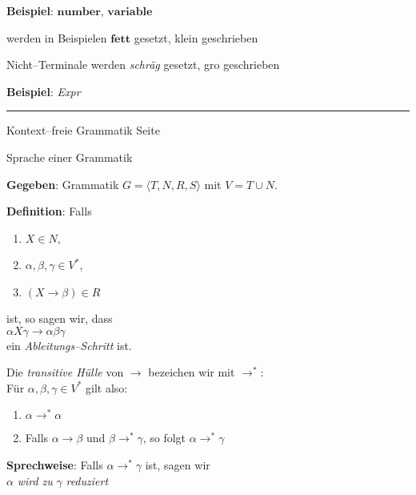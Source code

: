 \begin{slide}{}
\begin{enumerate}
      \textbf{Beispiel}: $\mathbf{number}$, $\mathbf{variable}$
    
      werden in Beispielen $\mathbf{fett}$ gesetzt, klein geschrieben
\end{enumerate}
Nicht--Terminale werden \textsl{schr\"ag} gesetzt, gro\3 geschrieben

\textbf{Beispiel}: \textsl{Expr}

\vspace*{\fill}
\tiny \addtocounter{mypage}{1}
\rule{17cm}{1mm}
Kontext--freie Grammatik  \hspace*{\fill} Seite 
\end{slide}


\begin{slide}{}
\normalsize

\begin{center}
Sprache einer Grammatik
\end{center}
\vspace*{0.5cm}

\footnotesize
\textbf{Gegeben}: Grammatik $G = \langle T, N, R, S \rangle$ mit $V = T \cup N$.

\textbf{Definition}: Falls
\begin{enumerate}
\item $X \in N$,
\item $\alpha, \beta, \gamma \in V^*$,
\item $(X \rightarrow \beta) \in R$
\end{enumerate}
ist, so sagen wir, dass \\[0.3cm]
\hspace*{1.3cm} $\alpha X \gamma \rightarrow \alpha \beta \gamma$ \\[0.3cm]
ein \emph{Ableitungs--Schritt}  ist.

Die \emph{transitive H\"ulle} von $\rightarrow$ bezeichen wir mit $\rightarrow^*$: \\
F\"ur $\alpha, \beta, \gamma \in V^*$ gilt also:
\begin{enumerate}
\item $\alpha \rightarrow^* \alpha$
\item Falls $\alpha \rightarrow \beta$ und $\beta \rightarrow^* \gamma$, so folgt $\alpha \rightarrow^* \gamma$
\end{enumerate}
\textbf{Sprechweise}: Falls $\alpha \rightarrow^* \gamma$ ist, sagen wir \\[0.3cm]
\hspace*{1.3cm}  $\alpha$ \emph{wird zu} $\gamma$ \emph{reduziert}


\end{slide}
